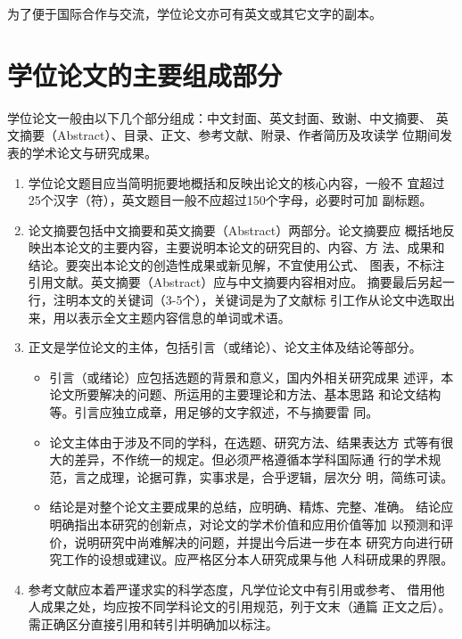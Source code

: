 为了便于国际合作与交流，学位论文亦可有英文或其它文字的副本。

\section{学位论文的主要组成部分}

学位论文一般由以下几个部分组成：中文封面、英文封面、致谢、中文摘要、
英文摘要（Abstract）、目录、正文、参考文献、附录、作者简历及攻读学
位期间发表的学术论文与研究成果。

\begin{enumerate}
\item 学位论文题目应当简明扼要地概括和反映出论文的核心内容，一般不
  宜超过25个汉字（符），英文题目一般不应超过150个字母，必要时可加
  副标题。

\item 论文摘要包括中文摘要和英文摘要（Abstract）两部分。论文摘要应
  概括地反映出本论文的主要内容，主要说明本论文的研究目的、内容、方
  法、成果和结论。要突出本论文的创造性成果或新见解，不宜使用公式、
  图表，不标注引用文献。英文摘要（Abstract）应与中文摘要内容相对应。
  摘要最后另起一行，注明本文的关键词（3-5个），关键词是为了文献标
  引工作从论文中选取出来，用以表示全文主题内容信息的单词或术语。

  \item 正文是学位论文的主体，包括引言（或绪论）、论文主体及结论等部分。
    \begin{itemize}
    \item 引言（或绪论）应包括选题的背景和意义，国内外相关研究成果
      述评，本论文所要解决的问题、所运用的主要理论和方法、基本思路
      和论文结构等。引言应独立成章，用足够的文字叙述，不与摘要雷
      同。

    \item 论文主体由于涉及不同的学科，在选题、研究方法、结果表达方
      式等有很大的差异，不作统一的规定。但必须严格遵循本学科国际通
      行的学术规范，言之成理，论据可靠，实事求是，合乎逻辑，层次分
      明，简练可读。

    \item 结论是对整个论文主要成果的总结，应明确、精炼、完整、准确。
      结论应明确指出本研究的创新点，对论文的学术价值和应用价值等加
      以预测和评价，说明研究中尚难解决的问题，并提出今后进一步在本
      研究方向进行研究工作的设想或建议。应严格区分本人研究成果与他
      人科研成果的界限。
    \end{itemize}

  \item 参考文献应本着严谨求实的科学态度，凡学位论文中有引用或参考、
    借用他人成果之处，均应按不同学科论文的引用规范，列于文末（通篇
    正文之后）。需正确区分直接引用和转引并明确加以标注。


\end{enumerate}
